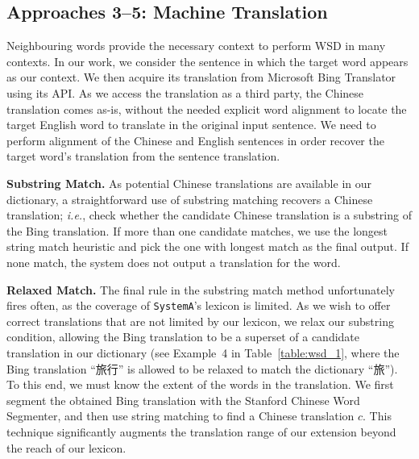\begin{CJK}{UTF8}{gbsn}
\subsection{Approaches 3--5: Machine Translation}

Neighbouring words provide the necessary context to perform WSD in
many contexts. In our work, we consider the sentence in which the
target word appears as our context. We then acquire its translation
from Microsoft Bing
Translator using its
API.  As we access the translation as a third party, the Chinese
translation comes as-is, without the needed explicit word alignment to
locate the target English word to translate in the original input
sentence. We need to perform alignment of the Chinese and English
sentences in order recover the target word's translation from the
sentence translation.

{\bf Substring Match.} As potential Chinese translations are
available in our dictionary, a straightforward use of substring
matching recovers a Chinese translation; {\it i.e.}, check whether the
candidate Chinese translation is a substring of the Bing
translation. If more than one candidate matches, we use the longest
string match heuristic and pick the one with longest match as the
final output. If none match, the system does not output a translation
for the word.  


{\bf Relaxed Match.} The final rule in the substring match method
unfortunately fires often, as the coverage of {\tt SystemA}'s lexicon
is limited.  As we wish to offer correct translations that are not
limited by our lexicon, we relax our substring condition, allowing the
Bing translation to be a superset of a candidate translation in our
dictionary (see Example~4 in Table~\ref{table:wsd_1}, where the Bing
translation ``旅行'' is allowed to be relaxed to match the dictionary
``旅'').
To this end, we must know the extent of the words in the translation.
We first segment the obtained Bing translation with the Stanford
Chinese Word Segmenter, and then use string matching to find a Chinese
translation $c$.  This technique significantly augments the
translation range of our extension beyond the reach of our lexicon.




\end{CJK}
